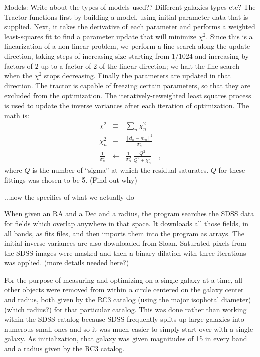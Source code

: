 \documentclass[12pt,preprint,pdftex]{aastex}
\begin{document}
Models: Write about the types of models used?? Different galaxies types etc?
The Tractor functions first by building a model, using initial parameter data that is supplied. Next, it takes the derivative of each parameter and performs a weighted least-squares fit to find a parameter update that will minimize $\chi^2$.  Since this is a linearization of a non-linear problem, we perform a line search along the update direction, taking steps of increasing size starting from $1/1024$ and increasing by factors of $2$ up to a factor of $2$ of the linear direction; we halt the line-search when the $\chi^2$ stops decreasing.  Finally the parameters are updated in that direction. The tractor is capable of freezing certain parameters, so that they are excluded from the optimization. 
The iteratively-reweighted least squares process is used to update the
inverse variances after each iteration of optimization. The math is:
\begin{eqnarray}
\chi^2 &\equiv& \sum_n \chi_n^2
\\
\chi_n^2 &\equiv& \frac{[d_n - m_n]^2}{\sigma_n^2}
\\
\frac{1}{\sigma_n^2} &\leftarrow& \frac{1}{\sigma_n^2}\,\frac{Q^2}{Q^2+\chi_n^2}
\quad ,
\end{eqnarray}
where $Q$ is the number of ``sigma'' at which the residual saturates. $Q$ for these fittings was chosen to be 5. (Find out why)

...now the specifics of what we actually do

When given an RA and a Dec and a radius, the program searches the SDSS data for fields which overlap anywhere in that space. It downloads all those fields, in all bands, as fits files, and then imports them into the program as arrays. The initial inverse variances are also downloaded from Sloan.
Saturated pixels from the SDSS images were masked and then a binary dilation with three iterations was applied. (more details needed here?)

For the purpose of measuring and optimizing on a single galaxy at a
time, all other objects were removed from within a circle centered on
the galaxy center and radius, both given by the RC3 catalog (using the major isophotal diameter)
(which radius?) for that particular catalog. This was done rather than
working within the SDSS catalog because SDSS frequently splits up large
galaxies into numerous small ones and so it was much easier to simply
start over with a single galaxy. As initialization, that galaxy was
given magnitudes of 15 in every band and a radius given by the RC3
catalog.
\end{document}
